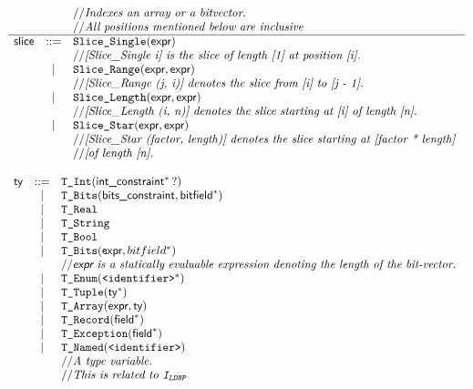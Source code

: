 \documentclass{book}
\begin{document}

\[
\begin{array}{rcl}
&&// \textit{Indexes an array or a bitvector.}\ \\
&&// \textit{All positions mentioned below are inclusive}\ \\
\hline
\textsf{slice} &::=& \texttt{Slice\_Single} (\textsf{expr}) \\
  & & // \textit{[Slice\_Single i] is the slice of length [1] at position [i].}\ \\
  &|& \texttt{Slice\_Range}(\textsf{expr}, \textsf{expr}) \\
  & & // \textit{[Slice\_Range (j, i)] denotes the slice from [i] to [j - 1].}\ \\
  &|& \texttt{Slice\_Length}(\textsf{expr}, \textsf{expr}) \\
  & & // \textit{[Slice\_Length (i, n)] denotes the slice starting at [i] of length
          [n].}\ \\
  &|& \texttt{Slice\_Star}(\textsf{expr}, \textsf{expr}) \\
  & & // \textit{[Slice\_Star (factor, length)] denotes the slice starting at [factor
          * length]}\ \\
  & & // \textit{[of length [n].}\ \\
\end{array}
\]

\[
\begin{array}{rcl}
\ty &::=& \TInt(\intconstraint^*\,?) \\
  &|& \TBits(\bitsconstraint, \bitfield^{*}) \\
  &|& \TReal \\
  &|& \TString \\
  &|& \TBool \\
  &|& \TBits(\expr, bitfield^{*}) \\
  & & \ASTComment{\expr\ is a statically evaluable expression denoting the length of the bit-vector.}\\
  &|& \TEnum(\identifier^{*}) \\
  &|& \TTuple(\ty^{*}) \\
  &|& \TArray(\expr, \ty) \\
  &|& \TRecord(\Field^{*}) \\
  &|& \TException(\Field^{*}) \\
  &|& \TNamed(\identifier)\\
  & & \ASTComment{A type variable.}\\
  & & \ASTComment{This is related to \identi{LDNP}}
\end{array}
\]
\end{document}
